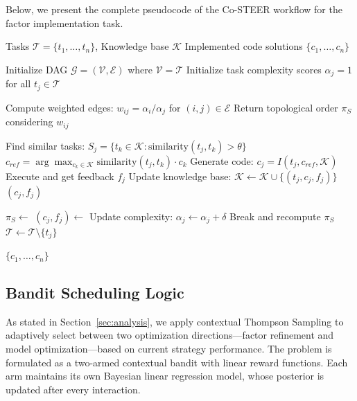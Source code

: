 \documentclass{article}
\begin{document}
Below, we present the complete pseudocode of the Co-STEER workflow for the factor implementation task.

\begin{algorithm}
\caption{\texttt{Co-STEER}: Collaborative Scheduling and Task Execution Engine for Quant Research}
\label{algo:costeer}
\begin{algorithmic}[1]
\Require Tasks $\mathcal{T} = \{t_1, \dots, t_n\}$, Knowledge base $\mathcal{K}$
\Ensure Implemented code solutions $\{c_1, \dots, c_n\}$

\State Initialize DAG $\mathcal{G} = (\mathcal{V}, \mathcal{E})$ where $\mathcal{V} = \mathcal{T}$
\State Initialize task complexity scores $\alpha_j = 1$ for all $t_j \in \mathcal{T}$

    \State Compute weighted edges: $w_{ij} = \alpha_i / \alpha_j$ for $(i,j) \in \mathcal{E}$
    \State Return topological order $\pi_S$ considering $w_{ij}$
\EndFunction

    \State Find similar tasks: $S_j = \{t_k \in \mathcal{K} : \text{similarity}(t_j, t_k) > \theta\}$
    \State $c_{ref} = \arg\max_{c_k \in \mathcal{K}} \text{similarity}(t_j, t_k) \cdot c_k$
    \State Generate code: $c_j = I(t_j, c_{ref}, \mathcal{K})$
    \State Execute and get feedback $f_j$
    \State Update knowledge base: $\mathcal{K} \gets \mathcal{K} \cup \{(t_j, c_j, f_j)\}$
    \State \Return $(c_j, f_j)$
\EndFunction

    \State $\pi_S \gets$ 
        \State $(c_j, f_j) \gets$ 
            \State Update complexity: $\alpha_j \gets \alpha_j + \delta$
            \State Break and recompute $\pi_S$
        \Else
            \State $\mathcal{T} \gets \mathcal{T} \setminus \{t_j\}$
        \EndIf
    \EndFor
\EndWhile

\State \Return $\{c_1, \dots, c_n\}$
\end{algorithmic}
\end{algorithm}

\subsection{Bandit Scheduling Logic}
\label{app:linear_thompson_two_arm}
As stated in Section~\ref{sec:analysis}, we apply contextual Thompson Sampling to adaptively select between two optimization directions—factor refinement and model optimization—based on current strategy performance. The problem is formulated as a two-armed contextual bandit with linear reward functions. Each arm maintains its own Bayesian linear regression model, whose posterior is updated after every interaction.
\end{document}
